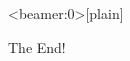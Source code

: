 \documentclass[10pt,xcolor=table,ignorenonframetext,handout,aspectratio=169]{beamer}
\begin{document}

\begin{frame}<beamer:0>[plain]

	
	\begin{center}
		

		\Large{\textcolor{williams}{The End!}}
		
	\end{center}
	
\end{frame}
\end{document}
